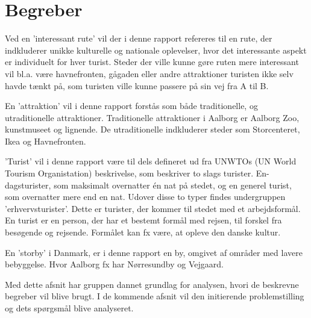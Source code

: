 \section{Begreber}
Ved en ’interessant rute’ vil der i denne rapport refereres til en rute, der indkluderer unikke kulturelle og nationale oplevelser, hvor det interessante aspekt er individuelt for hver turist. Steder der ville kunne gøre ruten mere interessant vil bl.a. være havnefronten, gågaden eller andre attraktioner turisten ikke selv havde tænkt på, som turisten ville kunne passere på sin vej fra A til B.\newline

En ’attraktion’ vil i denne rapport forstås som både traditionelle, og utraditionelle attraktioner. Traditionelle attraktioner i Aalborg er Aalborg Zoo, kunstmuseet og lignende. De utraditionelle indkluderer steder som Storcenteret, Ikea og Havnefronten.\newline

’Turist’ vil i denne rapport være til dels defineret ud fra UNWTOs (UN World Tourism Organistation) beskrivelse, som beskriver to slags turister. En-dagsturister, som maksimalt overnatter én nat på stedet, og en generel turist, som overnatter mere end en nat\citep{Turismen}. Udover disse to typer findes undergruppen ’erhvervsturister’. Dette er turister, der kommer til stedet med et arbejdsformål. \newline
En turist er en person, der har et bestemt formål med rejsen, til forskel fra besøgende og rejsende. Formålet kan fx være, at opleve den danske kultur. \newline

En ’storby’ i Danmark, er i denne rapport en by, omgivet af områder med lavere bebyggelse. Hvor Aalborg fx har Nørresundby og Vejgaard.

Med dette afsnit har gruppen dannet grundlag for analysen, hvori de beskrevne begreber vil blive brugt. I de kommende afsnit vil den initierende problemstilling og dets spørgsmål blive analyseret.
